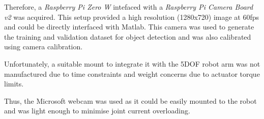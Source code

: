\documentclass{UoNMCHA}
\numberwithin{equation}{section}
\begin{document}
Therefore, a \textit{Raspberry Pi Zero W} intefaced with a \textit{Raspberry Pi Camera Board v2} was acquired. This setup provided a high resolution (1280x720) image at 60fps and could be directly interfaced with Matlab. This camera was used to generate the training and validation dataset for object detection and was also calibrated using camera calibration. \


Unfortunately, a suitable mount to integrate it with the 5DOF robot arm was not manufactured due to time constraints and weight concerns due to actuator torque limits. \


Thus, the Microsoft webcam was used as it could be easily mounted to the robot and was light enough to minimise joint current overloading. 


%
%
%
%
%
%
\end{document}
